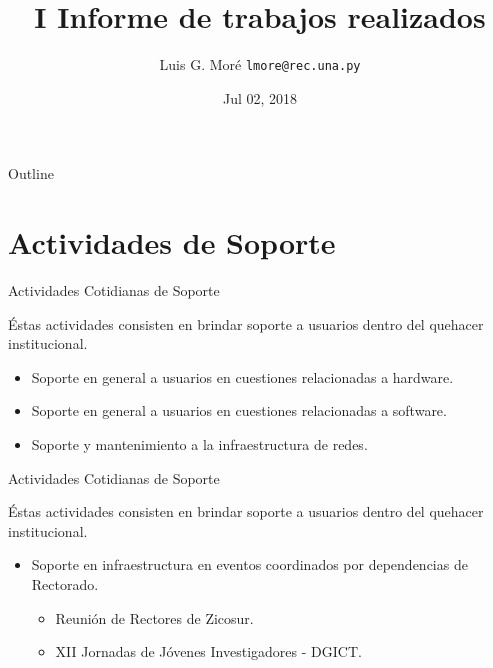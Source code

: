 \documentclass[usenames,dvipsnames]{beamer}
\title[Rectorado - UNA]{ \vspace{30pt} I Informe de trabajos realizados}
\date[Jul 02, 2018]{Jul 02, 2018}
\author[Luis G. Moré]{
\vspace{1cm}
Luis G. Moré
\pdfnewline
\texttt{lmore@rec.una.py}
}
\institute{Universidad Nacional de Asunción - Rectorado}
\begin{document}
\begin{frame}
\titlepage
\end{frame}

\begin{frame}{Outline}
\tableofcontents
\end{frame}


\section{Actividades de Soporte}
\begin{frame}{Actividades Cotidianas de Soporte}

Éstas actividades consisten en brindar soporte a usuarios dentro del quehacer institucional.
             	
\begin{itemize}
    \item Soporte en general a usuarios en cuestiones relacionadas a hardware.
	\item Soporte en general a usuarios en cuestiones relacionadas a software.
	\item Soporte y mantenimiento a la infraestructura de redes.
\end{itemize}


\end{frame}

\begin{frame}{Actividades Cotidianas de Soporte}

Éstas actividades consisten en brindar soporte a usuarios dentro del quehacer institucional.
             	
\begin{itemize}
    \item Soporte en infraestructura en eventos coordinados por dependencias de Rectorado.
    
    \begin{itemize}
		\item Reunión de Rectores de Zicosur.
		\item XII Jornadas de Jóvenes Investigadores - DGICT.
	\end{itemize}

\end{itemize}

\end{frame}
\end{document}
